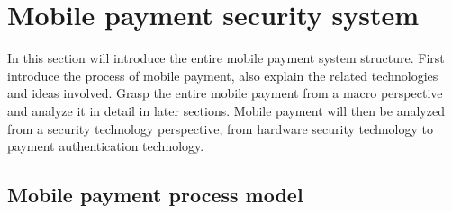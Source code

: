 \documentclass[journal]{IEEEtran}
\begin{document}
%


\section{Mobile payment security system}
In this section will introduce the entire mobile payment system structure. First introduce the process of mobile payment, also explain the related technologies and ideas involved. Grasp the entire mobile payment from a macro perspective and analyze it in detail in later sections. Mobile payment will then be analyzed from a security technology perspective, from hardware security technology to payment authentication technology.

\subsection{Mobile payment process model}
\end{document}

